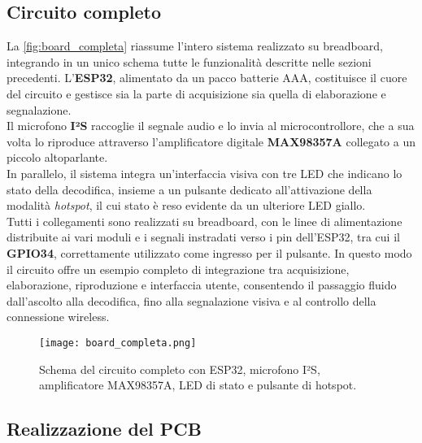 \subsection{Circuito completo}
\label{subsec:circuito_completo}

La \autoref{fig:board_completa} riassume l’intero sistema realizzato su breadboard, integrando in un 
unico schema tutte le funzionalità descritte nelle sezioni precedenti. L’\textbf{ESP32}, alimentato da 
un pacco batterie AAA, costituisce il cuore del circuito e gestisce sia la parte di acquisizione sia quella 
di elaborazione e segnalazione. \\
Il microfono \textbf{I²S} raccoglie il segnale audio e lo invia al microcontrollore, 
che a sua volta lo riproduce attraverso l’amplificatore digitale \textbf{MAX98357A} collegato a un piccolo altoparlante.\\
 In parallelo, il sistema integra un’interfaccia visiva con tre LED che indicano lo stato della decodifica, insieme a un
  pulsante dedicato all’attivazione della modalità \textit{hotspot}, il cui stato è reso evidente da un ulteriore LED giallo. \\
  Tutti i collegamenti sono realizzati su breadboard, con le linee di alimentazione distribuite ai vari moduli e i segnali instradati 
  verso i pin dell’ESP32, tra cui il \textbf{GPIO34}, correttamente utilizzato come ingresso per il pulsante. In questo modo il circuito 
  offre un esempio completo di integrazione tra acquisizione, elaborazione, riproduzione e interfaccia utente, consentendo il passaggio 
  fluido dall’ascolto alla decodifica, fino alla segnalazione visiva e al controllo della connessione wireless.

\begin{figure}[H]
  \centering
  \texttt{[image: board\_completa.png]}
  \caption{Schema del circuito completo con ESP32, microfono I²S, amplificatore MAX98357A, LED di stato e pulsante di hotspot.}
  \label{fig:board_completa}
\end{figure}

\subsection{Realizzazione del PCB}
\label{subsec:pcb_completo}

